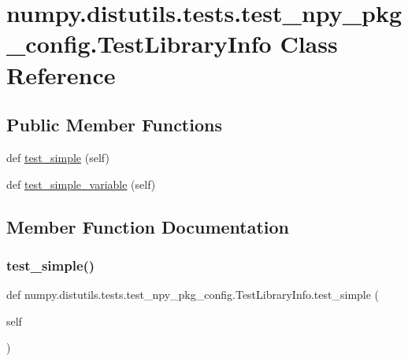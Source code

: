 \hypertarget{classnumpy_1_1distutils_1_1tests_1_1test__npy__pkg__config_1_1TestLibraryInfo}{}\section{numpy.\+distutils.\+tests.\+test\+\_\+npy\+\_\+pkg\+\_\+config.\+Test\+Library\+Info Class Reference}
\label{classnumpy_1_1distutils_1_1tests_1_1test__npy__pkg__config_1_1TestLibraryInfo}
\subsection*{Public Member Functions}
\begin{DoxyCompactItemize}
\item 
def \hyperlink{classnumpy_1_1distutils_1_1tests_1_1test__npy__pkg__config_1_1TestLibraryInfo_a3cc6b3b56ba225b458a83a23b6d1277f}{test\+\_\+simple} (self)
\item 
def \hyperlink{classnumpy_1_1distutils_1_1tests_1_1test__npy__pkg__config_1_1TestLibraryInfo_a967bc3866d4e144536e4463961f5996f}{test\+\_\+simple\+\_\+variable} (self)
\end{DoxyCompactItemize}


\subsection{Member Function Documentation}
\mbox{\label{classnumpy_1_1distutils_1_1tests_1_1test__npy__pkg__config_1_1TestLibraryInfo_a3cc6b3b56ba225b458a83a23b6d1277f}} 
\subsubsection{\texorpdfstring{test\+\_\+simple()}{test\_simple()}}
{\footnotesize\ttfamily def numpy.\+distutils.\+tests.\+test\+\_\+npy\+\_\+pkg\+\_\+config.\+Test\+Library\+Info.\+test\+\_\+simple (\begin{DoxyParamCaption}\item[{}]{self }\end{DoxyParamCaption})}

